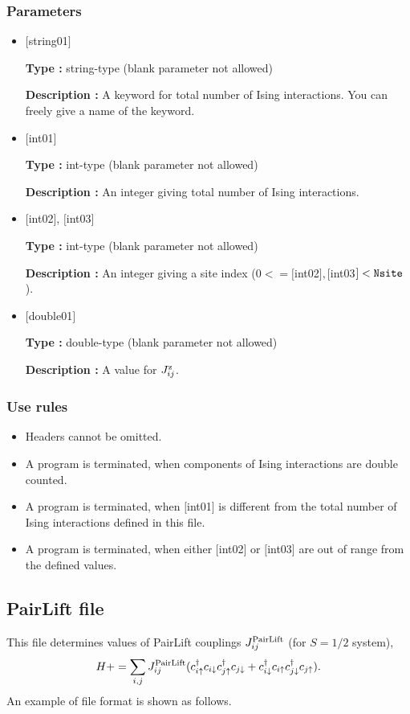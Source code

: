 \subsubsection{Parameters}
 \begin{itemize}

   \item  $[$string01$]$
   
    {\bf Type :} string-type (blank parameter not allowed)

   {\bf Description :}  A keyword for total number of Ising interactions. You can freely give a name of the keyword.

   \item  $[$int01$]$
   
    {\bf Type :} int-type (blank parameter not allowed)

   {\bf Description :} An integer giving total number of Ising interactions.

  \item  $[$int02$]$, $[$int03$]$
  
 {\bf Type :} int-type (blank parameter not allowed)

{\bf Description :} An integer giving a site index ($0<= [$int02$], [$int03$]<\verb|Nsite|$).
 
 \item  $[$double01$]$
   
   {\bf Type :} double-type (blank parameter not allowed)

  {\bf Description :}   A value for $J_{ij}^{\rm z}$.
  
\end{itemize}

\subsubsection{Use rules}
\begin{itemize}
\item Headers cannot be omitted. 
\item A program is terminated, when components of Ising interactions are double counted.
\item A program is terminated, when $[$int01$]$ is different from the total number of Ising interactions defined in this file.
\item A program is terminated, when either $[$int02$]$ or $[$int03$]$ are out of range from the defined values.
\end{itemize}


\newpage
\subsection{PairLift file}
\label{Subsec:pairlift}
This file determines values of PairLift couplings $J_{ij}^{\rm PairLift}$ {(for $S=1/2$ system)},
\begin{equation}
H+=\sum_{i,j}J_{ij}^{\rm PairLift} (c_ {i \uparrow}^{\dag}c_{i\downarrow}c_{j \uparrow}^{\dag}c_{j \downarrow}+c_ {i \downarrow}^{\dag}c_{i\uparrow}c_{j \downarrow}^{\dag}c_{j \uparrow}).
\end{equation}
An example of file format is shown as follows.

